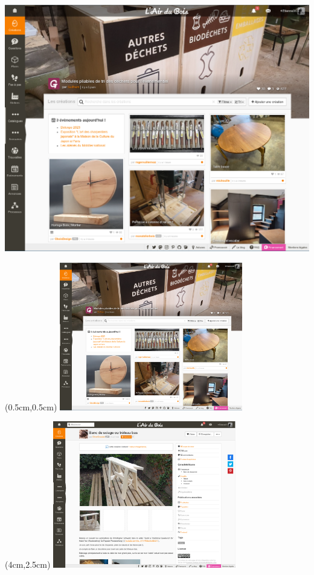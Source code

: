 \begin{frame}
  \begin{center}
    \includegraphics[width=\framewidth]{img/home.png}
  \end{center}
\end{frame}

\begin{frame}
  \begin{textblock*}{8cm}(0.5cm,0.5cm)
    \includegraphics[width=8cm]{img/home.png}
    \end{textblock*}
  \begin{textblock*}{8cm}(4cm,2.5cm)
    \includegraphics[width=8cm]{img/creation.png}
    \end{textblock*}

\end{frame}


